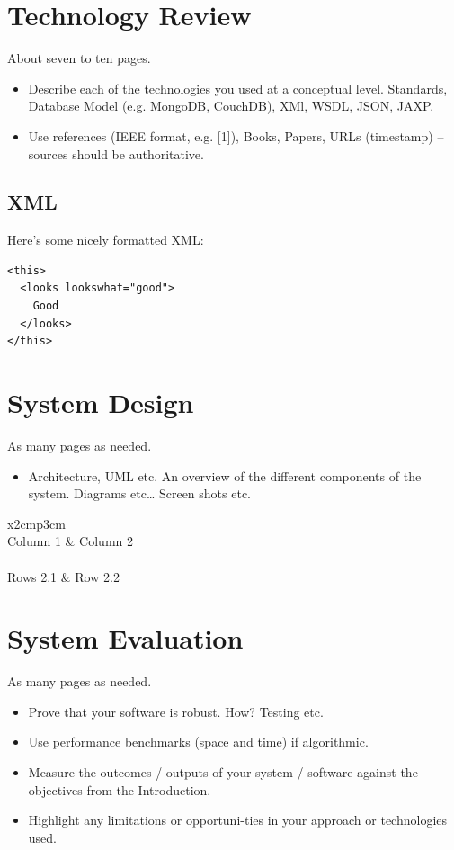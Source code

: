 \chapter{Technology Review}
About seven to ten pages.
\begin{itemize}
\item Describe each of the technologies you used at a conceptual level. Standards, Database Model (e.g. MongoDB, CouchDB), XMl, WSDL, JSON, JAXP.
\item Use references (IEEE format, e.g. [1]), Books, Papers, URLs (timestamp) – sources should be authoritative. 
\end{itemize}

\section{XML}
Here's some nicely formatted XML:
\begin{verbatim}
<this>
  <looks lookswhat="good">
    Good
  </looks>
</this>
\end{verbatim}

\chapter{System Design}
As many pages as needed.
\begin{itemize}
\item Architecture, UML etc. An overview of the different components of the system. Diagrams etc… Screen shots etc.
\end{itemize}

\begin{table}[h]
  \centering
  \begin{tabular}{x{2cm}p{3cm}}
    \toprule \\
    Column 1 & Column 2 \\
    \midrule \\
    Rows 2.1 & Row 2.2 \\
    \bottomrule
  \end{tabular}
  \caption{A table.}
  \label{table:mytable}
\end{table}

\chapter{System Evaluation}
As many pages as needed.
\begin{itemize}
\item Prove that your software is robust. How? Testing etc. 
\item Use performance benchmarks (space and time) if algorithmic.
\item Measure the outcomes / outputs of your system / software against the objectives from the Introduction.
\item Highlight any limitations or opportuni-ties in your approach or technologies used.
\end{itemize}

